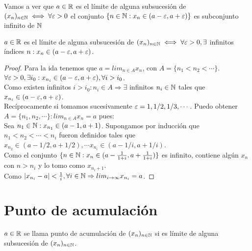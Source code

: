 Vamos a ver que $a \in \mathbb{R}$ es el límite de alguna subsucesión de $(x_n)_{n \in \mathbb{N}} \iff \forall \varepsilon > 0$ el conjunto $\{ n \in \mathbb{N} : x_n \in (a - \varepsilon, a + \varepsilon) \}$ es subconjunto infinito de $\mathbb{N}$
\begin{theorem}
  $a \in \mathbb{R}$ es el límite de alguna subsucesión de $(x_n)_{n \in \mathbb{N}} \iff \forall \varepsilon > 0, \exists$ infinitos índices $n : x_n \in (a-\varepsilon, a+\varepsilon)$.
  \begin{proof}
    Para la ida tenemos que $a = lim_{n \in A} x_n$, con $A = \{ n_1 < n_2 < \cdots \}$. \\
    $\forall \varepsilon > 0, \exists i_0 : x_{n_i} \in (a - \varepsilon, a + \varepsilon), \forall i > i_0$. \\
    Como existen infinitos $i > i_0 : n_i \in A \Rightarrow \exists$ infinitos $n_i \in \mathbb{N}$ tales que $x_{n_i} \in (a - \varepsilon, a + \varepsilon)$. \\

    Recíprocamente si tomamos sucesivamente $\varepsilon = 1, 1/2, 1/3, \cdots$. Puedo obtener $A = \{ n_1, n_2, \cdots \} : lim_{n \in A} x_n = a$ pues: \\
    Sea $n_1 \in \mathbb{N} : x_{n_1} \in (a-1, a+1)$. Supongamos por inducción que $n_1 < n_2 < \cdots < n_i$ fueron definidos tales que $x_{n_2} \in (a - 1/2, a + 1/2), \cdots x_{n_i} \in (a - 1/i, a + 1/i)$. \\
    Como el conjunto $\{ n \in \mathbb{N} : x_n \in (a - \frac{1}{1+i}, a + \frac{1}{1+i}) \}$ es infinito, contiene algún $x_n$ con $n > n_i$ y lo tomo como $x_{n_i + 1}$. \\
    Como $| x_{n_i} - a | < \frac{1}{i}, \forall i \in \mathbb{N} \Rightarrow lim_{i \to \infty} x_{n_i} = a$.
  \end{proof}
\end{theorem}

\section{Punto de acumulación}

\begin{definition}
  $a \in \mathbb{R}$ se llama punto de acumulación de $(x_n)_{n \in \mathbb{N}}$ si es límite de alguna subsucesión de $(x_n)_{n \in \mathbb{N}}$.
\end{definition}

